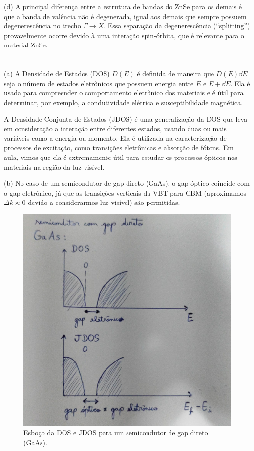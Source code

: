 \documentclass[a4paper,10pt]{article}
\begin{document}
\n\n

(d) A principal diferença entre a estrutura de bandas do ZnSe para os demais é que a banda de valência não é degenerada, igual aos demais que sempre possuem degenerescência no trecho $\Gamma \to X$. Essa separação da degenerescência (``splitting'') provavelmente ocorre devido à uma interação spin-órbita, que é relevante para o material ZnSe.

\pagebreak

\section{}

(a) A Densidade de Estados (DOS) $D(E)$ é definida de maneira que $D(E) \dd{E}$ seja o número de estados eletrônicos que possuem energia entre $E$ e $E + \dd{E}$. Ela é usada para compreender o comportamento eletrônico dos materiais e é útil para determinar, por exemplo, a condutividade elétrica e susceptibilidade magnética.

\n\n

A Densidade Conjunta de Estados (JDOS) é uma generalização da DOS que leva em consideração a interação entre diferentes estados, usando duas ou mais variáveis como a energia ou momento. Ela é utilizada na caracterização de processos de excitação, como transições eletrônicas e absorção de fótons. Em aula, vimos que ela é extremamente útil para estudar os processos ópticos nos materiais na região da luz visível.

\n\n

(b) No caso de um semicondutor de gap direto (GaAs), o gap óptico coincide com o gap eletrônico, já que as transições verticais da VBT para CBM (aproximamos $\Delta k \approx 0$ devido a considerarmos luz visível) são permitidas.

\begin{figure}[H]
\centering
\includegraphics[width=0.38\linewidth]{fig/dos-jdos-direto.jpeg}
\caption{Esboço da DOS e JDOS para um semicondutor de gap direto (GaAs).}
\label{fig:dos-jdos-direto}
\end{figure}
\end{document}
